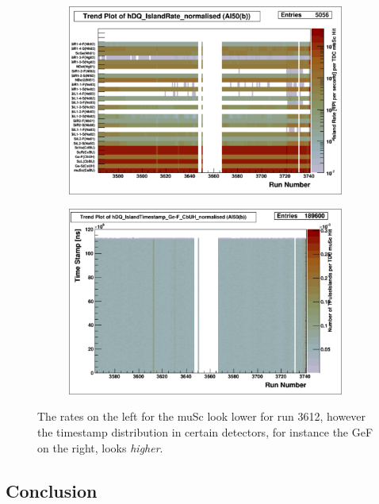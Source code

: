 \documentclass[a4paper]{article}
\begin{document}
\begin{figure}
  \centering
  \begin{subfigure}{0.5\textwidth}
    \includegraphics[width=0.9\linewidth]{figs/al50b/rates}
    \caption{}\label{fig:al50b_rates}
  \end{subfigure}%
  \begin{subfigure}{0.5\textwidth}
    \includegraphics[width=0.9\linewidth]{figs/al50b/gef_timestamps}
    \caption{}\label{fig:al50b_gef_timestamps}
  \end{subfigure}
  \caption{The rates on the left for the muSc look lower for run 3612, however the timestamp distribution in certain
    detectors, for instance the GeF on the right, looks \emph{higher}.}
  \label{fig:al50b_3612}
\end{figure}


\subsection{Conclusion}
\end{document}
